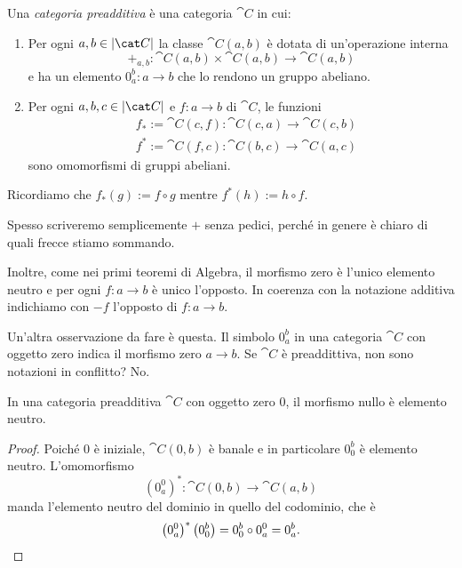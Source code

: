 \begin{definition}
  Una {\em categoria preadditiva} è una categoria \(\cat C\) in cui:
  \begin{enumerate}[leftmargin=*]
  \item Per ogni \(a, b \in \obj{\cat C}\) la classe \(\cat C(a, b)\) è
    dotata di un'operazione interna
    \[
      +_{a,b} : \cat C (a, b) \times \cat C (a, b) \to \cat C (a, b)
    \]
    e ha un elemento \(0_a^b : a \to b\) che lo rendono un gruppo
    abeliano.
  \item Per ogni \(a, b, c \in \obj{\cat C}\) e \(f : a \to b\) di
    \(\cat C\), le funzioni
    \begin{align*}
      & f_\ast := \cat C(c, f) : \cat C(c, a) \to \cat C(c, b) \\
      & f^\ast := \cat C(f, c) : \cat C(b, c) \to \cat C(a, c)
    \end{align*}
    sono omomorfismi di gruppi abeliani.
  \end{enumerate}
\end{definition}

\begin{recall}
  Ricordiamo che \(f_\ast(g) := f \circ g\) mentre \(f^\ast(h) := h \circ f\).
\end{recall}

Spesso scriveremo semplicemente \(+\) senza pedici, perché in genere è
chiaro di quali frecce stiamo sommando.

Inoltre, come nei primi teoremi di Algebra, il morfismo zero è l'unico
elemento neutro e per ogni \(f : a \to b\) è unico l'opposto. In
coerenza con la notazione additiva indichiamo con \(- f\) l'opposto di
\(f : a \to b\).

Un'altra osservazione da fare è questa. Il simbolo \(0_a^b\) in una
categoria \(\cat C\) con oggetto zero indica il morfismo zero
\(a \to b\). Se \(\cat C\) è preaddittiva, non sono notazioni in
conflitto?  No.

\begin{proposition}
  In una categoria preadditiva \(\cat C\) con oggetto zero \(0\), il
  morfismo nullo è elemento neutro.
\end{proposition}

\begin{proof}
  Poiché \(0\) è iniziale, \(\cat C(0, b)\) è banale e in particolare
  \(0_0^b\) è elemento neutro. L'omomorfismo
  \[
    \left(0_a^0\right)^\ast : \cat C(0, b) \to \cat C(a, b)
  \]
  manda l'elemento neutro del dominio in quello del codominio, che è
  \[
    \left(0_a^0\right)^\ast\left(0_0^b\right) = 0_0^b \circ 0_a^0 = 0_a^b
    . \qedhere
  \]
\end{proof}

